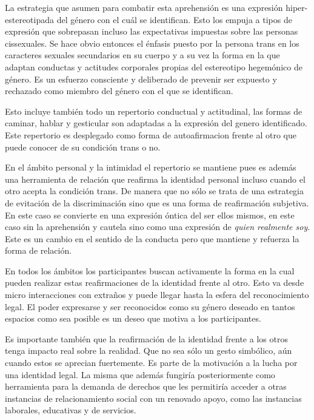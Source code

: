 La estrategia que asumen para combatir esta aprehensión es una expresión
hiper-estereotipada del género con el cuál se identifican. Esto los empuja a
tipos de expresión que sobrepasan incluso las expectativas impuestas sobre las
personas cissexuales. Se hace obvio entonces el énfasis puesto por la persona
trans en los caracteres sexuales secundarios en su cuerpo y a su vez la forma en
la que adaptan conductas y actitudes corporales propias del estereotipo
hegemónico de género. Es un esfuerzo consciente y deliberado de prevenir ser
expuesto y rechazado como miembro del género con el que se identifican.

Esto incluye también todo un repertorio conductual y actitudinal, las formas de
caminar, hablar y gesticular son adaptadas a la expresión del genero
identificado. Este repertorio es desplegado como forma de autoafirmacion frente
al otro que puede conocer de su condición trans o no.

En el ámbito personal y la intimidad el repertorio se mantiene pues es además
una herramienta de relación que reafirma la identidad personal incluso cuando el
otro acepta la condición trans. De manera que no sólo se trata de una estrategia
de evitación de la discriminación sino que es una forma de reafirmación
subjetiva. En este caso se convierte en una expresión óntica del ser ellos
mismos, en este caso sin la aprehensión y cautela sino como una expresión de
\emph{quien realmente soy}. Este es un cambio en el sentido de la conducta pero
que mantiene y refuerza la forma de relación.

En todos los ámbitos los participantes buscan activamente la forma en la cual
pueden realizar estas reafirmaciones de la identidad frente al otro. Esto va
desde micro interacciones con extraños y puede llegar hasta la esfera del
reconocimiento legal. El poder expresarse y ser reconocidos como su género
deseado en tantos espacios como sea posible es un deseo que motiva a los
participantes.

Es importante también que la reafirmación de la identidad frente a los otros
tenga impacto real sobre la realidad. Que no sea sólo un gesto simbólico, aún
cuando estos se aprecian fuertemente. Es parte de la motivación a la lucha por
una identidad legal. La misma que además fungiría posteriormente como
herramienta para la demanda de derechos que les permitiría acceder a otras
instancias de relacionamiento social con un renovado apoyo, como las instancias
laborales, educativas y de servicios.
